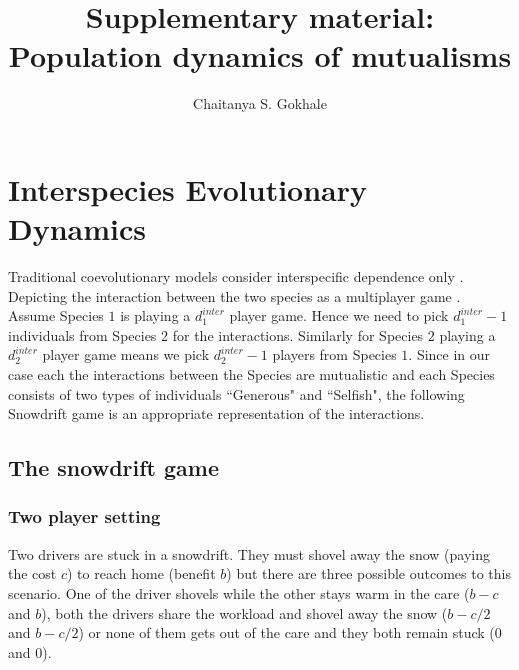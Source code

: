 \documentclass[times,onecolumn]{scrartcl}
\begin{document}
\linenumbers

\title{Supplementary material: \\
Population dynamics of mutualisms}

\author{
Chaitanya S. Gokhale 
}

\maketitle

\section*{Interspecies Evolutionary Dynamics}

Traditional coevolutionary models consider interspecific dependence only \cite{roughgarden:TPB:1976,roughgarden:book:1983}.
Depicting the interaction between the two species as a multiplayer game \cite{gokhale:PNAS:2010}.
Assume Species $1$ is playing a $d_1^{inter}$ player game.
Hence we need to pick $d_1^{inter}-1$ individuals from Species $2$ for the interactions.
Similarly for Species $2$ playing a $d_2^{inter}$ player game means we pick $d_2^{inter}-1$ players from Species $1$.
Since in our case each the interactions between the Species are mutualistic and each Species consists of two types of individuals ``Generous" and ``Selfish", the following Snowdrift game is an appropriate representation of the interactions.





\subsection*{The snowdrift game}
\label{appA}
\subsubsection*{Two player setting}
Two drivers are stuck in a snowdrift.
They must shovel away the snow (paying the cost $c$) to reach home (benefit $b$) but there are three possible outcomes to this scenario.
One of the driver shovels while the other stays warm in the care ($b-c$ and $b$), both the drivers share the workload and shovel away the snow ($b-c/2$ and $b-c/2$) or none of them gets out of the care and they both remain stuck ($0$ and $0$).
\end{document}
